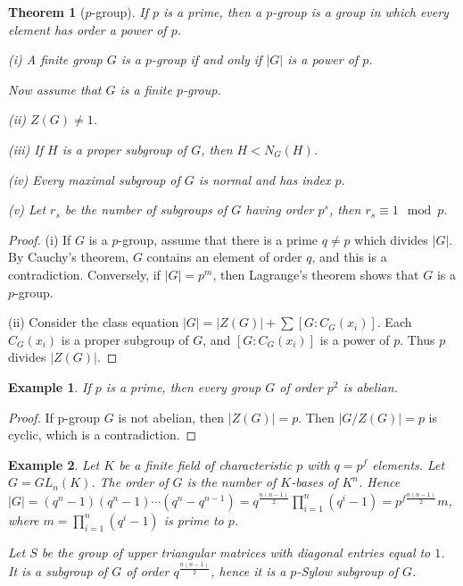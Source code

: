 \documentclass{article}
\newtheorem{Thm}{Theorem}[section]
\newtheorem{Eg}{Example}[section]
\theoremstyle{definition}
\begin{document}
\begin{Thm}[$p$-group]
If $p$ is a prime, then a $p$-group is a group in which every element has order a power of $p$.\par 
(i) A finite group $G$ is a $p$-group if and only if $\left|G\right|$ is a power of $p$.\par 
Now assume that $G$ is a finite $p$-group.\par 
(ii) $Z(G)\ne 1$.\par 
(iii) If $H$ is a proper subgroup of $G$, then $H<N_G(H)$.\par 
(iv) Every maximal subgroup of $G$ is normal and has index $p$.\par 
(v) Let $r_s$ be the number of subgroups of $G$ having order $p^s$, then $r_s\equiv 1\mod{p}$.
\end{Thm}
\begin{proof}
(i) If $G$ is a $p$-group, assume that there is a prime $q\ne p$ which divides $\left|G\right|$. By Cauchy's theorem, $G$ contains an element of order $q$, and this is a contradiction.
Conversely, if $\left|G\right|=p^m$, then Lagrange's theorem shows that $G$ is a $p$-group.\par 
(ii) Consider the class equation $\left|G\right|=\left|Z(G)\right|+\sum \left[G:C_G(x_i)\right]$. Each $C_G(x_i)$ is a proper subgroup of $G$, and $\left[G:C_G(x_i)\right]$ is a power of $p$.
Thus $p$ divides $\left|Z(G)\right|$.
\end{proof}

\begin{Eg}
If $p$ is a prime, then every group $G$ of order $p^2$ is abelian.
\end{Eg}
\begin{proof}
If p-group $G$ is not abelian, then $\left|Z(G)\right|=p$. Then $\left|G/Z(G)\right|=p$ is cyclic, which is a contradiction.
\end{proof}

\begin{Eg}
Let $K$ be a finite field of characteristic $p$ with $q=p^f$ elements. Let $G=GL_n(K)$.
The order of $G$ is the number of $K$-bases of $K^n$. Hence $\left|G\right|=(q^n-1)(q^n-1)\cdots(q^n-q^{n-1})=q^{\frac{n(n-1)}{2}}\prod_{i=1}^n(q^i-1)=p^{f\frac{n(n-1)}{2}}m$,
where $m=\prod_{i=1}^n(q^i-1)$ is prime to $p$.\par 
Let $S$ be the group of upper triangular matrices with diagonal entries equal to $1$. It is a subgroup of $G$ of order $q^{\frac{n(n-1)}{2}}$, hence it is a $p$-Sylow subgroup of $G$.
\end{Eg}
\end{document}
